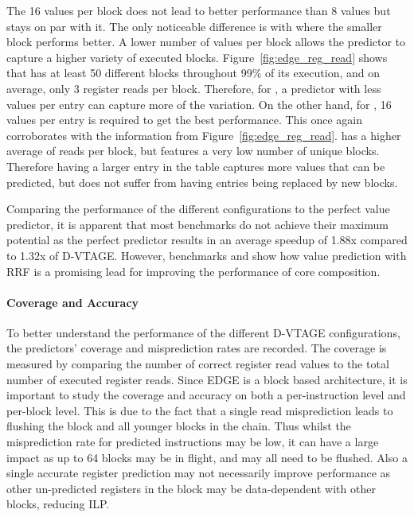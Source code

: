 The 16 values per block does not lead to better performance than 8 values but stays on par with it.
The only noticeable difference is with  where the smaller block performs better.
A lower number of values per block allows the predictor to capture a higher variety of executed blocks.
Figure~\ref{fig:edge_reg_read} shows that  has at least 50 different blocks throughout 99\% of its execution, and on average, only 3 register reads per block.
Therefore, for , a predictor with less values per entry can capture more of the variation.
On the other hand, for , 16 values per entry is required to get the best performance.
This once again corroborates with the information from Figure~\ref{fig:edge_reg_read}.
 has a higher average of reads per block, but features a very low number of unique blocks.
Therefore having a larger entry in the table captures more values that can be predicted, but does not suffer from having entries being replaced by new blocks.

Comparing the performance of the different configurations to the perfect value predictor, it is apparent that most benchmarks do not achieve their maximum potential as the perfect predictor results in an average speedup of 1.88x compared to 1.32x of D-VTAGE.
However, benchmarks  and  show how value prediction with RRF is a promising lead for improving the performance of core composition.

\paragraph*{Coverage and Accuracy}
To better understand the performance of the different D-VTAGE configurations, the predictors' coverage and misprediction rates are recorded.
The coverage is measured by comparing the number of correct register read values to the total number of executed register reads.
Since EDGE is a block based architecture, it is important to study the coverage and accuracy on both a per-instruction level and per-block level.
This is due to the fact that a single read misprediction leads to flushing the block and all younger blocks in the chain.
Thus whilst the misprediction rate for predicted instructions may be low, it can have a large impact as up to 64 blocks may be in flight, and may all need to be flushed.
Also a single accurate register prediction may not necessarily improve performance as other un-predicted registers in the block may be data-dependent with other blocks, reducing ILP.

